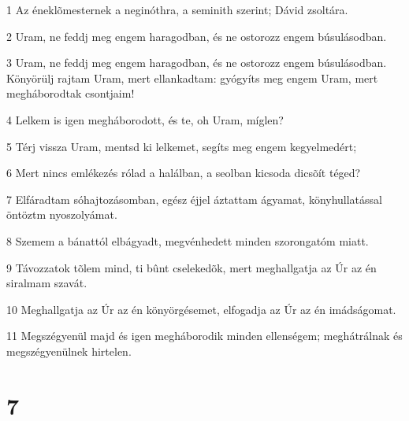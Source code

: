 \par 1 Az éneklõmesternek a neginóthra, a seminith szerint; Dávid zsoltára.
\par 2 Uram, ne feddj meg engem haragodban, és ne ostorozz engem búsulásodban.
\par 3 Uram, ne feddj meg engem haragodban, és ne ostorozz engem búsulásodban. Könyörülj rajtam Uram, mert ellankadtam: gyógyíts meg engem Uram, mert megháborodtak csontjaim!
\par 4 Lelkem is igen megháborodott, és te, oh Uram, míglen?
\par 5 Térj vissza Uram, mentsd ki lelkemet, segíts meg engem kegyelmedért;
\par 6 Mert nincs emlékezés rólad a halálban, a seolban kicsoda dicsõít téged?
\par 7 Elfáradtam sóhajtozásomban, egész éjjel áztattam ágyamat, könyhullatással öntöztm nyoszolyámat.
\par 8 Szemem a bánattól elbágyadt, megvénhedett minden szorongatóm miatt.
\par 9 Távozzatok tõlem mind, ti bûnt cselekedõk, mert meghallgatja az Úr az én siralmam szavát.
\par 10 Meghallgatja az Úr az én könyörgésemet, elfogadja az Úr az én imádságomat.
\par 11 Megszégyenül majd és igen megháborodik minden ellenségem; meghátrálnak és megszégyenülnek hirtelen.

\chapter{7}

